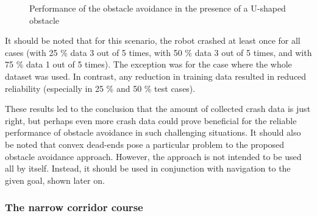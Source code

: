 \begin{figure}
    \centering
    \hfill
    \caption{Performance of the obstacle avoidance in the presence of a U-shaped obstacle}
    \label{fig:Fig09}
\end{figure}

It should be noted that for this scenario, the robot crashed at least once for all cases (with 25 \% data 3 out of 5 times, with 50 \% data 3 out of 5 times, and with 75 \% data 1 out of 5 times). The exception was for the case where the whole dataset was used. In contrast, any reduction in training data resulted in reduced reliability (especially in 25 \% and 50 \% test cases).

These results led to the conclusion that the amount of collected crash data is just right, but perhaps even more crash data could prove beneficial for the reliable performance of obstacle avoidance in such challenging situations. It should also be noted that convex dead-ends pose a particular problem to the proposed obstacle avoidance approach. However, the approach is not intended to be used all by itself. Instead, it should be used in conjunction with navigation to the given goal, shown later on.

\subsubsection{The narrow corridor course}

